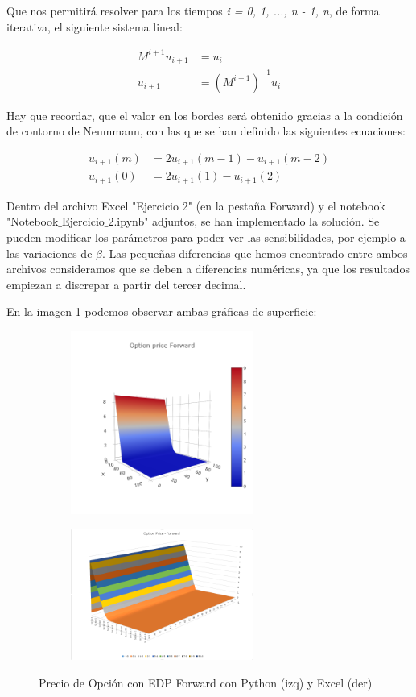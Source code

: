 \documentclass[titlepage]{article}
\begin{document}
Que nos permitirá resolver para los tiempos \textit{i = 0, 1, ..., n - 1, n}, de forma iterativa, el siguiente sistema lineal:

\begin{align*}
	M^{i+1}u_{i+1} &= u_{i} \\
	u_{i+1} &= (M^{i+1})^{-1} u_{i}
\end{align*}

Hay que recordar, que el valor en los bordes será obtenido gracias a la condición de contorno de Neummann, con las que se han definido las siguientes ecuaciones: 

\begin{align*}
	u_{i+1}(m) &= 2u_{i+1}(m-1) - u_{i+1}(m-2)\\
	u_{i+1}(0) &= 2u_{i+1}(1) - u_{i+1}(2)
\end{align*}

Dentro del archivo Excel "Ejercicio 2" (en la pestaña Forward) y el notebook "Notebook$\_$Ejercicio$\_$2.ipynb" adjuntos, se han implementado la solución. Se pueden modificar los parámetros para poder ver las sensibilidades, por ejemplo a las variaciones de $\beta$. Las pequeñas diferencias que hemos encontrado entre ambos archivos consideramos que se deben a diferencias numéricas, ya que los resultados empiezan a discrepar a partir del tercer decimal.

\vspace{5pt}
En la imagen \ref{fig: EDP Forward} podemos observar ambas gráficas de superficie:

\begin{figure}
	\begin{subfigure}{7cm}
    	\centering\includegraphics[width=6cm]{PyEDPForward}
  	\end{subfigure}
  	\begin{subfigure}{7cm}
    	\centering\includegraphics[width=6cm]{ExEDPForward}
  	\end{subfigure}
  	\caption{Precio de Opción con EDP Forward con Python (izq) y Excel (der)}
  	\label{fig: EDP Forward}
\end{figure}
\end{document}
